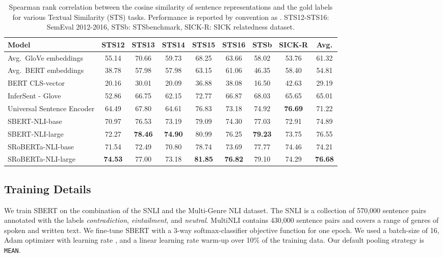 \documentclass[11pt,a4paper]{article}
\begin{document}
\begin{table*}[t]
	\centering 
	\footnotesize
	\begin{tabular}{|l|c|c|c|c|c|c|c||c|}
		\hline
		\textbf{Model} & \textbf{STS12} & \textbf{STS13} & \textbf{STS14} & \textbf{STS15} & \textbf{STS16} & \textbf{STSb} & \textbf{SICK-R} & \textbf{Avg.} \\ \hline
		Avg.\ GloVe embeddings & 55.14 & 70.66 & 59.73 & 68.25 & 63.66 & 58.02 & 53.76 & 61.32 \\
		Avg.\ BERT embeddings & 38.78 & 57.98 & 57.98 & 63.15 & 61.06 & 46.35 & 58.40 & 54.81 \\
		BERT CLS-vector & 20.16 & 30.01 & 20.09 & 36.88 & 38.08 & 16.50 & 42.63 & 29.19 \\
		InferSent - Glove & 52.86 & 66.75 & 62.15 & 72.77 & 66.87 & 68.03 & 65.65 &  65.01 \\
		Universal Sentence Encoder & 64.49 & 67.80 & 64.61 & 76.83 & 73.18 & 74.92 & \textbf{76.69} & 71.22 \\ \hline
		SBERT-NLI-base & 70.97 & 76.53 & 73.19 & 79.09 & 74.30 & 77.03 & 72.91 & 74.89 \\
		SBERT-NLI-large & {72.27} & \textbf{78.46} & \textbf{74.90} & {80.99} & {76.25} & \textbf{79.23} & 73.75 & {76.55} \\ \hline 
		SRoBERTa-NLI-base & 71.54 & 72.49 & 70.80 & 78.74 & 73.69 & 77.77 & 74.46 & 74.21  \\ 
		SRoBERTa-NLI-large & \textbf{74.53} & 77.00 & 73.18 & \textbf{81.85} & \textbf{76.82} & 79.10 & 74.29 & \textbf{76.68} \\ \hline
	\end{tabular}
	\caption{Spearman rank correlation  between the cosine similarity of sentence representations and the gold labels for various Textual Similarity (STS) tasks. Performance is reported by convention as . STS12-STS16: SemEval 2012-2016, STSb: STSbenchmark, SICK-R: SICK relatedness dataset.}
	\label{table_sts_tasks}
\end{table*}


\subsection{Training Details}
We train SBERT on the combination of the SNLI \cite{snli} and the Multi-Genre NLI \cite{multinli} dataset. The SNLI is a collection of 570,000 sentence pairs annotated with the labels \textit{contradiction}, \textit{eintailment}, and \textit{neutral}. MultiNLI contains 430,000 sentence pairs and covers a range of genres of spoken and written text. We fine-tune SBERT with a 3-way softmax-classifier objective function for one epoch. We used a batch-size of 16, Adam optimizer with learning rate , and a linear learning rate warm-up over 10\% of the training data. Our default pooling strategy is \texttt{MEAN}.
\end{document}
